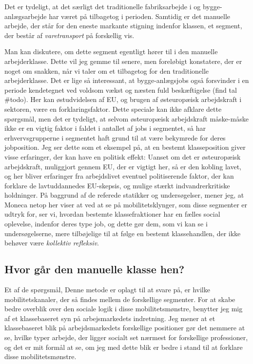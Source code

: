 Det er tydeligt, at det særligt det traditionelle fabriksarbejde i  og bygge-anlægsarbejde har været på tilbagetog i perioden. Samtidig er det manuelle arbejde, der står for den eneste markante stigning indenfor klassen, et segment, der består af \emph{varetransport} på forskellig vis. 

Man kan diskutere, om dette segment egentligt hører til i den manuelle arbejderklasse. Dette vil jeg gemme til senere, men foreløbigt konstatere, der er noget om snakken, når vi taler om et tilbagetog for den traditionelle arbejderklasse. Det er lige så interessant, at bygge-anlægsjobs også forsvinder i en periode kendetegnet ved voldsom vækst og næsten fuld beskæftigelse (find tal \#todo). Her kan østudvidelsen af EU, og brugen af østeuropæisk arbejdskraft i sektoren, være en forklaringsfaktor. Dette speciale kan ikke afklare dette spørgsmål, men det er tydeligt, at selvom østeuropæisk arbejdskraft måske-måske ikke er en vigtig faktor i faldet i antallet af jobs i segmentet, så har erhvervsgrupperne i segmentet haft grund til at være bekymrede for deres jobposition. Jeg ser dette som et eksempel på, at en bestemt klasseposition giver visse erfaringer, der kan have en politisk effekt: Uanset om det er østeuropæisk arbejdskraft, muliggjort gennem EU, der er vigtigt her, så er den kobling lavet, og her bliver erfaringer fra arbejdslivet eventuel politiserende faktor, der kan forklare de lavtuddannedes EU-skepsis, og mulige stærkt indvandrerkritiske holdninger. På baggrund af de referede statikker og undersøgelser, mener jeg, at Moneca netop her viser at ved at se på mobilitetsklynger, som disse segmenter er udtryk for, ser vi, hvordan bestemte klassefraktioner har en fælles social oplevelse, indenfor deres type job, og dette gør dem, som vi kan se i undersøgelserne, mere tilbøjelige til at følge en bestemt klassehandlen, der ikke behøver være \emph{kollektiv refleksiv}. 

%
\subsection{Hvor går den manuelle klasse hen? \label{subsec delanalyse3 manuelle arbejdsklasse hvorhen mobilitet}}
%

Et af de spørgsmål, Denne metode er oplagt til at svare på, er hvilke mobilitetskanaler, der så findes mellem de forskellige segmenter. For at skabe bedre overblik over den sociale logik i disse mobilitetsmønstre, benytter jeg mig af et klassebaseret syn på arbejsmarkedets indretning. Jeg mener at et klassebaseret blik på arbejdsmarkedets forskellige positioner gør det nemmere at se, hvilke typer arbejde, der ligger socialt set nærmest for forskellige professioner, og det er mit formål at se, om jeg med dette blik er bedre i stand til at forklare disse mobilitetsmønstre.

